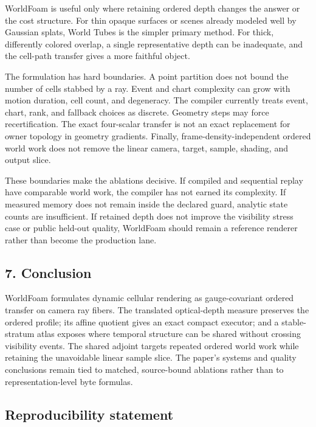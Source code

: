 \documentclass[
]{article}
\begin{document}
WorldFoam is useful only where retaining ordered depth changes the
answer or the cost structure. For thin opaque surfaces or scenes already
modeled well by Gaussian splats, World Tubes is the simpler primary
method. For thick, differently colored overlap, a single representative
depth can be inadequate, and the cell-path transfer gives a more
faithful object.

The formulation has hard boundaries. A point partition does not bound
the number of cells stabbed by a ray. Event and chart complexity can
grow with motion duration, cell count, and degeneracy. The compiler
currently treats event, chart, rank, and fallback choices as discrete.
Geometry steps may force recertification. The exact four-scalar transfer
is not an exact replacement for owner topology in geometry gradients.
Finally, frame-density-independent ordered world work does not remove
the linear camera, target, sample, shading, and output slice.

These boundaries make the ablations decisive. If compiled and sequential
replay have comparable world work, the compiler has not earned its
complexity. If measured memory does not remain inside the declared
guard, analytic state counts are insufficient. If retained depth does
not improve the visibility stress case or public held-out quality,
WorldFoam should remain a reference renderer rather than become the
production lane.

\subsection{7. Conclusion}\label{conclusion}

WorldFoam formulates dynamic cellular rendering as gauge-covariant
ordered transfer on camera ray fibers. The translated optical-depth
measure preserves the ordered profile; its affine quotient gives an
exact compact executor; and a stable-stratum atlas exposes where
temporal structure can be shared without crossing visibility events. The
shared adjoint targets repeated ordered world work while retaining the
unavoidable linear sample slice. The paper's systems and quality
conclusions remain tied to matched, source-bound ablations rather than
to representation-level byte formulas.

\subsection{Reproducibility statement}\label{reproducibility-statement}
\end{document}
